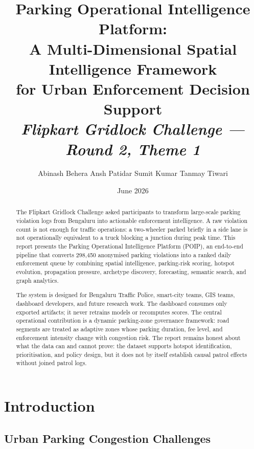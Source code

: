 \documentclass[12pt,a4paper]{article}
\title{%
  \LARGE\bfseries
  Parking Operational Intelligence Platform:\\
  A Multi-Dimensional Spatial Intelligence Framework\\
  for Urban Enforcement Decision Support\\[6pt]
  \large\normalfont\textit{Flipkart Gridlock Challenge — Round 2, Theme 1}
}
\author{%
  \small Abinash Behera \enspace Ansh Patidar \enspace Sumit Kumar \enspace Tanmay Tiwari%
}
\date{\normalsize June 2026}
\begin{document}

\maketitle
\thispagestyle{empty}

\begin{abstract}
The Flipkart Gridlock Challenge asked participants to transform large-scale parking violation logs from Bengaluru into actionable enforcement intelligence. A raw violation count is not enough for traffic operations: a two-wheeler parked briefly in a side lane is not operationally equivalent to a truck blocking a junction during peak time. This report presents the Parking Operational Intelligence Platform (POIP), an end-to-end pipeline that converts 298,450 anonymised parking violations into a ranked daily enforcement queue by combining spatial intelligence, parking-risk scoring, hotspot evolution, propagation pressure, archetype discovery, forecasting, semantic search, and graph analytics.

The system is designed for Bengaluru Traffic Police, smart-city teams, GIS teams, dashboard developers, and future research work. The dashboard consumes only exported artifacts; it never retrains models or recomputes scores. The central operational contribution is a dynamic parking-zone governance framework: road segments are treated as adaptive zones whose parking duration, fee level, and enforcement intensity change with congestion risk. The report remains honest about what the data can and cannot prove: the dataset supports hotspot identification, prioritisation, and policy design, but it does not by itself establish causal patrol effects without joined patrol logs.
\end{abstract}

\vspace*{\fill}

\newpage
\tableofcontents
\newpage

\section{Introduction}

\subsection{Urban Parking Congestion Challenges}
\end{document}
